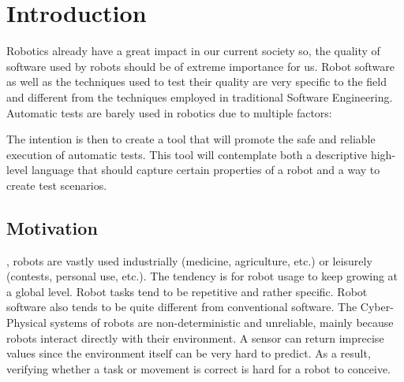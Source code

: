 \chapter{Introduction}
\label{chap:introduction}


Robotics already have a great impact in our current society so, 
the quality of software used by robots should be of extreme importance for us.
Robot software as well as the techniques used to test their quality are 
very specific to the field  and different from the techniques employed in traditional Software Engineering.
Automatic tests are barely used in robotics due to multiple factors: 



The intention is then to create a tool that will promote the safe 
and reliable execution of automatic tests.
This tool will contemplate both a descriptive high-level language 
that should capture certain properties of a robot and a way to create test scenarios.

\section{Motivation}
\label{sec:motivation}

, robots are vastly used industrially (medicine, agriculture, etc.) 
or leisurely (contests, personal use, etc.).
The tendency is for robot usage to keep growing at a global level.
Robot tasks tend to be repetitive and rather specific.
 Robot software also tends to be quite different from conventional software.
The Cyber-Physical systems of robots are non-deterministic and unreliable, mainly because robots interact directly with their environment.
A sensor can return imprecise values since the environment itself can be very hard to predict.
As a result, verifying whether a task or movement is correct is hard for a robot to conceive.

